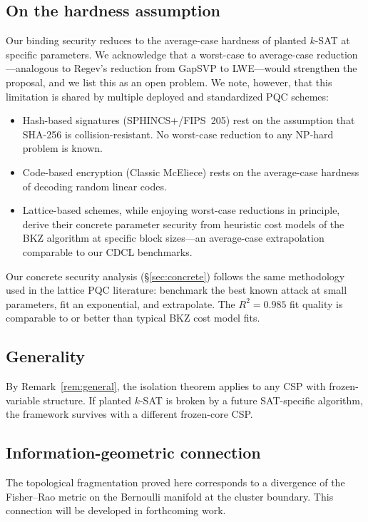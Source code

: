 \documentclass[11pt]{article}
\begin{document}
\subsection{On the hardness assumption}

Our binding security reduces to the average-case hardness of planted $k$-SAT at specific parameters.  We acknowledge that a worst-case to average-case reduction---analogous to Regev's reduction from GapSVP to LWE---would strengthen the proposal, and we list this as an open problem.  We note, however, that this limitation is shared by multiple deployed and standardized PQC schemes:
\begin{itemize}
\item Hash-based signatures (SPHINCS+/FIPS~205) rest on the assumption that SHA-256 is collision-resistant.  No worst-case reduction to any NP-hard problem is known.
\item Code-based encryption (Classic McEliece) rests on the average-case hardness of decoding random linear codes.
\item Lattice-based schemes, while enjoying worst-case reductions in principle, derive their concrete parameter security from heuristic cost models of the BKZ algorithm at specific block sizes---an average-case extrapolation comparable to our CDCL benchmarks.
\end{itemize}
Our concrete security analysis (\S\ref{sec:concrete}) follows the same methodology used in the lattice PQC literature: benchmark the best known attack at small parameters, fit an exponential, and extrapolate.  The $R^2 = 0.985$ fit quality is comparable to or better than typical BKZ cost model fits.


\subsection{Generality}

By Remark~\ref{rem:general}, the isolation theorem applies to any CSP with frozen-variable structure.  If planted $k$-SAT is broken by a future SAT-specific algorithm, the framework survives with a different frozen-core CSP.


\subsection{Information-geometric connection}

The topological fragmentation proved here corresponds to a divergence of the Fisher--Rao metric on the Bernoulli manifold at the cluster boundary.  This connection will be developed in forthcoming work.
\end{document}
